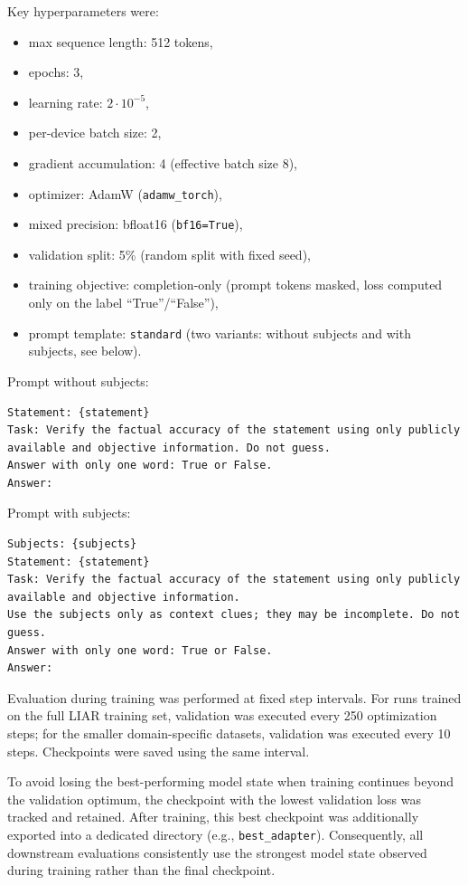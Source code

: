 Key hyperparameters were:
\begin{itemize}
    \item max sequence length: 512 tokens,
    \item epochs: 3,
    \item learning rate: $2 \cdot 10^{-5}$,
    \item per-device batch size: 2,
    \item gradient accumulation: 4 (effective batch size 8),
    \item optimizer: AdamW (\texttt{adamw\_torch}),
    \item mixed precision: bfloat16 (\texttt{bf16=True}),
    \item validation split: 5\% (random split with fixed seed),
    \item training objective: completion-only (prompt tokens masked, loss computed only on the label ``True''/``False''),
    \item prompt template: \texttt{standard} (two variants: without subjects and with subjects, see below).
\end{itemize}

\noindent Prompt without subjects:
\begin{verbatim}
Statement: {statement}
Task: Verify the factual accuracy of the statement using only publicly available and objective information. Do not guess.
Answer with only one word: True or False.
Answer:
\end{verbatim}

\noindent Prompt with subjects:
\begin{verbatim}
Subjects: {subjects}
Statement: {statement}
Task: Verify the factual accuracy of the statement using only publicly available and objective information.
Use the subjects only as context clues; they may be incomplete. Do not guess.
Answer with only one word: True or False.
Answer:
\end{verbatim}

Evaluation during training was performed at fixed step intervals. For runs trained on the full LIAR training set, validation was executed every 250 optimization steps; for the smaller domain-specific datasets, validation was executed every 10 steps. Checkpoints were saved using the same interval.

To avoid losing the best-performing model state when training continues beyond the validation optimum, the checkpoint with the lowest validation loss was tracked and retained. After training, this best checkpoint was additionally exported into a dedicated directory (e.g., \texttt{best\_adapter}). Consequently, all downstream evaluations consistently use the strongest model state observed during training rather than the final checkpoint.


